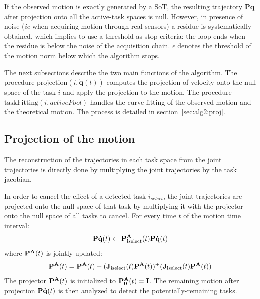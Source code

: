 \documentclass[journal]{IEEEtran}
\begin{document}
If the observed motion is exactly generated by a SoT,
the resulting trajectory $\mathbf{P\dot{q}}$ after projection
onto all the active-task spaces is null. However, in presence of noise (\emph{ie} when
acquiring motion through real sensors)
a residue is systematically obtained, which implies to use a threshold
as stop criteria: the loop ends when the residue is below the noise of
the acquisition chain. $\epsilon$ denotes the threshold
of the motion norm below which the algorithm stops.

The next subsections describe the two main functions of the algorithm.
The procedure $\mathrm{projection}(i, \mathbf{\dot{q}}(t))$ computes the projection of
velocity onto the null space of the task $i$ and apply the projection to the motion.
The procedure $\mathrm{taskFitting}(i, activePool)$ handles the curve fitting
of the observed motion and the theoretical motion. The process is detailed in section~\ref{sec:alg2:proj}.


\subsection{Projection of the motion}
The reconstruction of the trajectories in each task space from the joint trajectories is directly
done by multiplying the joint trajectories by the task jacobian.

In order to cancel the effect of a detected task $i_{select}$, the joint trajectories are projected onto the null space
of that task by multiplying it with the projector onto the null space of all tasks to cancel.
For every time $t$ of the motion time interval:
\begin{equation}
  \mbf{P\dot{q}}(t) \leftarrow \mbf{P^A_{i\mathrm{select}}}(t) \mbf{P\dot{q}}(t)
  \label{eq:projection}
\end{equation}
where $ {\mathbf{P^A}}(t)$ is jointly updated:
\begin{equation*}
  \mbf{P^A}(t) = \mbf{P^A}(t) - (\mbf{J_{i\mathrm{select}}}(t)\mbf{P^A}(t))^+(\mbf{J_{i\mathrm{select}}}(t)\mbf{P^A}(t))
  \label{eq:projectionupdate}
\end{equation*}
The projector ${\mathbf{P^A}}(t)$ is initialized to ${\mathbf{P^A_0}}(t) = {\mathbf{I}}$. The
remaining motion after projection ${\mathbf{P\dot{q}}}(t) $ is then analyzed to
detect the potentially-remaining tasks.
\end{document}
